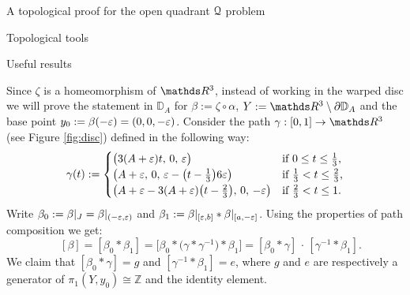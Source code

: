 \documentclass[11pt, a4paper, english, twoside, notitlepage, openright]{report}
\begin{document}
\begin{chapter}{A topological proof for the open quadrant $\mathcal{Q}$ problem}
\begin{section}{Topological tools}
\begin{subsection}{Useful results}
\begin{lemma}
\begin{Proof}
Since $\zeta$ is a homeomorphism of $\R^3$, instead of working in the warped disc we will prove the statement in ${\mathbb D}_A$ for $\beta:=\zeta\circ\alpha$, $Y:=\R^3\setminus\partial{\mathbb D}_A$ and the base point $y_0:=\beta(-\varepsilon)=(0,0,-\varepsilon)$. Consider the path $\gamma:[0,1]\rightarrow\R^3$ (see Figure \ref{fig:disc}) defined in the following way:
$$
\gamma(t):=
\begin{cases}
\big(3(A+\varepsilon)t,\,0,\,\varepsilon\big)&\text{if $0\le t\le\frac{1}{3}$,}\\
\big(A+\varepsilon,\, 0,\, \varepsilon-\big(t-\frac{1}{3}\big)6\varepsilon\big)&\text{if $\frac{1}{3}<t\le \frac{2}{3}$,}\\
\big(A+\varepsilon-3(A+\varepsilon)\big(t-\frac{2}{3}\big),\, 0,\, -\varepsilon\big)&\text{if $\frac{2}{3}<t\le 1$}.
\end{cases}
$$
Write $\beta_0:=\beta|_{J}=\beta|_{(-\varepsilon,\varepsilon)}$ and $\beta_1:=\beta|_{[\varepsilon,b]}\ast\beta|_{[a,-\varepsilon]}$. Using the properties of path composition we get:
$$
\quad[\beta]=[\beta_0\ast\beta_1]=\big[\beta_0\ast\big(\gamma\ast\gamma^{-1}\big)\ast\beta_1\big]=[\beta_0\ast\gamma]\,\cdot\,[\gamma^{-1}\ast\beta_1].
$$
We claim that $[\beta_0\ast\gamma]=g$ and $[\gamma^{-1}\ast\beta_1]=e$, where $g$ and $e$ are respectively a generator of $\pi_1(Y,y_0)\cong{\mathbb Z}$ and the identity element.


\end{Proof}
\end{lemma}
\end{subsection}
\end{section}
\end{chapter}
\end{document}
